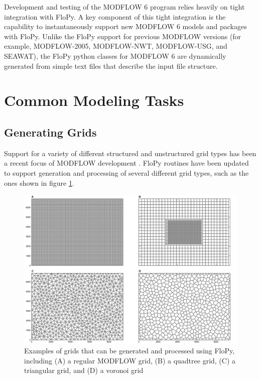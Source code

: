 \documentclass[utf8]{frontiersSCNS} %
\begin{document}
Development and testing of the MODFLOW 6 program relies heavily on tight integration with FloPy.  A key component of this tight integration is the capability to instantaneously support new MODFLOW 6 models and packages with FloPy.  Unlike the FloPy support for previous MODFLOW versions (for example, MODFLOW-2005, MODFLOW-NWT, MODFLOW-USG, and SEAWAT), the FloPy python classes for MODFLOW 6 are dynamically generated from simple text files that describe the input file structure.  

\section{Common Modeling Tasks}

\subsection{Generating Grids}

Support for a variety of different structured and unstructured grid types has been a recent focus of MODFLOW development \citep{modflowusg, modflow6gwf, modflow6xt3d}.  FloPy routines have been updated to support generation and processing of several different grid types, such as the ones shown in figure \ref{fig:grids}.  

\begin{figure}[h!]
\begin{center}
\includegraphics[width=15cm]{figures/grids.png}
\end{center}
\caption{Examples of grids that can be generated and processed using FloPy, including (A) a regular MODFLOW grid, (B) a quadtree grid, (C) a triangular grid, and (D) a voronoi grid}\label{fig:grids}
\end{figure}
\end{document}
